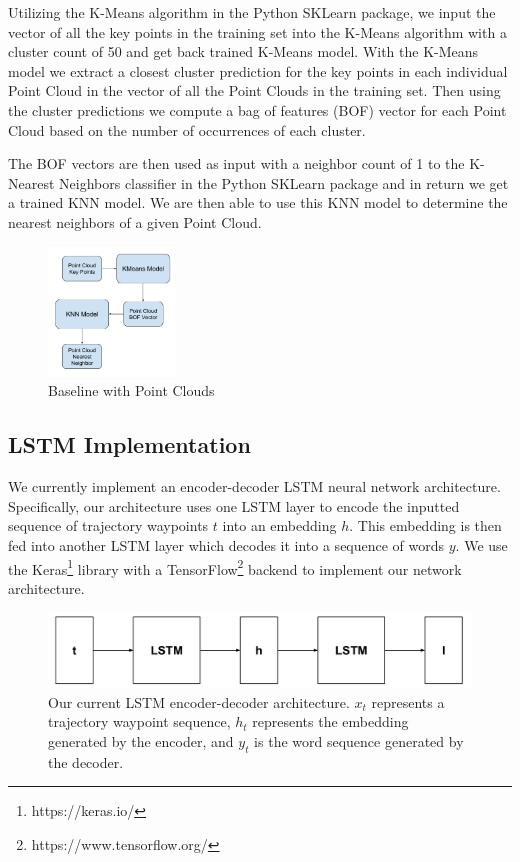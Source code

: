 \documentclass[letterpaper, 12 pt, conference]{ieeeconf}
\begin{document}
Utilizing the K-Means algorithm in the Python SKLearn package, we input the vector of all the key points in the training set into the K-Means algorithm with a cluster count of 50 and get back trained K-Means model. With the K-Means model we extract a closest cluster prediction for the key points in each individual Point Cloud in the vector of all the Point Clouds in the training set. Then using the cluster predictions we compute a bag of features (BOF) vector for each Point Cloud based on the number of occurrences of each cluster.

The BOF vectors are then used as input with a neighbor count of 1 to the K-Nearest Neighbors classifier in the Python SKLearn package and in return we get a trained KNN model. We are then able to use this KNN model to determine the nearest neighbors of a given Point Cloud. 


\begin{figure}[htb!]
  \centering
  \includegraphics[width=0.3\textwidth]{Baseline-[Point_Cloud]}
  \caption{Baseline with Point Clouds}
  \label{fig:Baseline_Point_Cloud}
\end{figure}

\subsection{LSTM Implementation}

We currently implement an encoder-decoder LSTM neural network architecture. Specifically, our architecture uses one LSTM layer to encode the inputted sequence of trajectory waypoints $t$ into an embedding $h$. This embedding is then fed into another LSTM layer which decodes it into a sequence of words $y$. We use the Keras\footnote{https://keras.io/} library with a TensorFlow\footnote{https://www.tensorflow.org/} backend to implement our network architecture.   

\begin{figure}[h]
\center
\includegraphics[scale=0.20]{Trajectory_LSTM}
\caption{Our current LSTM encoder-decoder architecture. $x_t$ represents a trajectory waypoint sequence, $h_t$ represents the embedding generated by the encoder, and $y_t$ is the word sequence generated by the decoder.}
\end{figure}
\end{document}
